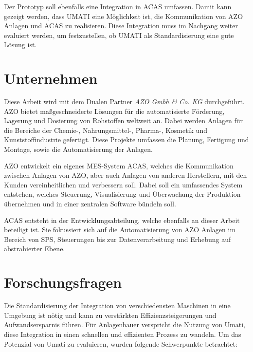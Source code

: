 \documentclass[a4paper, 12pt, oneside]{scrbook}
\begin{document}
	 Der Prototyp soll ebenfalls eine Integration in ACAS umfassen. Damit kann gezeigt werden, dass UMATI eine Möglichkeit ist, die Kommunikation von AZO Anlagen und ACAS zu realisieren. Diese Integration muss im Nachgang weiter evaluiert werden, um festzustellen, ob UMATI als Standardisierung eine gute Lösung ist.
	
	
	\section{Unternehmen}
	
	 Diese Arbeit wird mit dem Dualen Partner \textit{AZO Gmbh \& Co. KG} durchgeführt. AZO bietet maßgeschneiderte Lösungen für die automatisierte Förderung, Lagerung und Dosierung von Rohstoffen weltweit an. Dabei werden Anlagen für die Bereiche der Chemie-, Nahrungsmittel-, Pharma-, Kosmetik und Kunststoffindustrie gefertigt. Diese Projekte umfassen die Planung, Fertigung und Montage, sowie die Automatisierung der Anlagen.
	 
	 AZO entwickelt ein eigenes MES-System ACAS, welches die Kommunikation zwischen Anlagen von AZO, aber auch Anlagen von anderen Herstellern, mit den Kunden vereinheitlichen und verbessern soll. Dabei soll ein umfassendes System entstehen, welches Steuerung, Visualisierung und Überwachung der Produktion übernehmen und in einer zentralen Software bündeln soll.
	 
	 ACAS entsteht in der Entwicklungsabteilung, welche ebenfalls an dieser Arbeit beteiligt ist. Sie fokussiert sich auf die Automatisierung von AZO Anlagen im Bereich von SPS, Steuerungen bis zur Datenverarbeitung und Erhebung auf abstrahierter Ebene. 
	
	
	\section{Forschungsfragen}
	
	Die Standardisierung der Integration von verschiedensten Maschinen in eine Umgebung ist nötig und kann zu verstärkten Effizienzsteigerungen und Aufwandsersparnis führen. Für Anlagenbauer verspricht die Nutzung von Umati, diese Integration in einen schnellen und effizienten Prozess zu wandeln. Um das Potenzial von Umati zu evaluieren, wurden folgende Schwerpunkte betrachtet:
	
\end{document}
